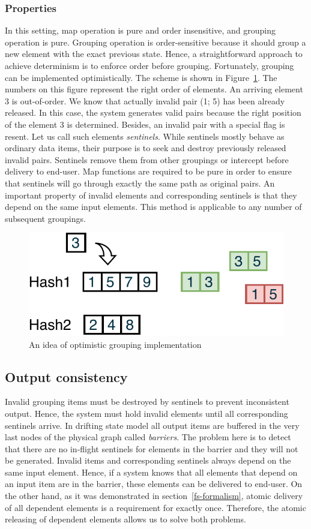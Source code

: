 \subsubsection{Properties}

In this setting, map operation is pure and order insensitive, and grouping operation is pure. Grouping operation is order-sensitive because it should group a new element with the exact previous state. Hence, a straightforward approach to achieve determinism is to enforce order before grouping. Fortunately, grouping can be implemented optimistically. The scheme is shown in Figure~\ref{optimistic-grouping}. The numbers on this figure represent the right order of elements. An arriving element 3 is out-of-order. We know that actually invalid pair (1; 5) has been already released. In this case, the system generates valid pairs because the right position of the element 3 is determined. Besides, an invalid pair with a special flag is resent. Let us call such elements {\em sentinels}. While sentinels mostly behave as ordinary data items, their purpose is to seek and destroy previously released invalid pairs. Sentinels remove them from other groupings or intercept before delivery to end-user. Map functions are required to be pure in order to ensure that sentinels will go through exactly the same path as original pairs. An important property of invalid elements and corresponding sentinels is that they depend on the same input elements. This method is applicable to any number of subsequent groupings.
 
\begin{figure}[htbp]
  \centering
  \includegraphics[width=.35\textwidth]{pics/grouping-invalidation}
  \caption{An idea of optimistic grouping implementation}
  \label {optimistic-grouping}
\end{figure} 

\subsection{Output consistency}

Invalid grouping items must be destroyed by sentinels to prevent inconsistent output. Hence, the system must hold invalid elements until all corresponding sentinels arrive. In drifting state model all output items are buffered in the very last nodes of the physical graph called {\em barriers}. The problem here is to detect that there are no in-flight sentinels for elements in the barrier and they will not be generated. Invalid items and corresponding sentinels always depend on the same input element. Hence, if a system knows that all elements that depend on an input item are in the barrier, these elements can be delivered to end-user. On the other hand, as it was demonstrated in section~\ref{fs-formalism}, atomic delivery of all dependent elements is a requirement for exactly once. Therefore, the atomic releasing of dependent elements allows us to solve both problems. 

